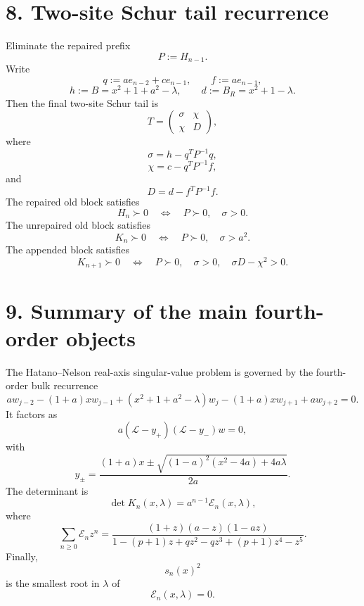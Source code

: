 \documentclass[11pt]{article}
\begin{document}
\section*{8. Two-site Schur tail recurrence}

Eliminate the repaired prefix
\[
P:=H_{n-1}.
\]
Write
\[
q:=a e_{n-2}+c e_{n-1},
\qquad
f:=a e_{n-1},
\]
\[
h:=B=x^2+1+a^2-\lambda,
\qquad
d:=B_R=x^2+1-\lambda.
\]
Then the final two-site Schur tail is
\[
\boxed{
T=
\begin{pmatrix}
\sigma & \chi\\
\chi & D
\end{pmatrix},
}
\tag{38}
\]
where
\[
\boxed{
\sigma=h-q^TP^{-1}q,
}
\tag{39}
\]
\[
\boxed{
\chi=c-q^TP^{-1}f,
}
\tag{40}
\]
and
\[
\boxed{
D=d-f^TP^{-1}f.
}
\tag{41}
\]
The repaired old block satisfies
\[
H_n\succ0
\quad\Longleftrightarrow\quad
P\succ0,\quad \sigma>0.
\]
The unrepaired old block satisfies
\[
K_n\succ0
\quad\Longleftrightarrow\quad
P\succ0,\quad \sigma>a^2.
\]
The appended block satisfies
\[
K_{n+1}\succ0
\quad\Longleftrightarrow\quad
P\succ0,\quad
\sigma>0,\quad
\sigma D-\chi^2>0.
\]

\section*{9. Summary of the main fourth-order objects}

The Hatano--Nelson real-axis singular-value problem is governed by the fourth-order bulk recurrence
\[
a w_{j-2}
-(1+a)xw_{j-1}
+
(x^2+1+a^2-\lambda)w_j
-(1+a)xw_{j+1}
+
a w_{j+2}=0.
\]
It factors as
\[
a(\mathcal L-y_+)(\mathcal L-y_-)w=0,
\]
with
\[
y_\pm=
\frac{(1+a)x
\pm
\sqrt{(1-a)^2(x^2-4a)+4a\lambda}}
{2a}.
\]
The determinant is
\[
\det K_n(x,\lambda)=a^{n-1}\mathcal E_n(x,\lambda),
\]
where
\[
\sum_{n\ge0}\mathcal E_nz^n
=
\frac{(1+z)(a-z)(1-az)}
{
1-(p+1)z+qz^2-qz^3+(p+1)z^4-z^5
}.
\]
Finally,
\[
s_n(x)^2
\]
is the smallest root in \(\lambda\) of
\[
\mathcal E_n(x,\lambda)=0.
\]
\end{document}
